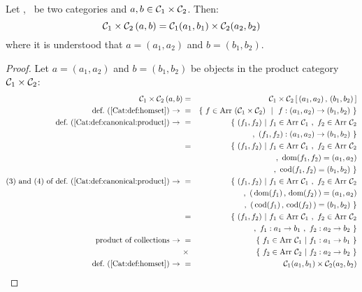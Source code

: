 \begin{prop}\label{Cat:prop:homset:product}
    Let \Cone, \Ctwo\ be two categories and $a,b\in\mbox{${\cal C}_{1}$}\times\mbox{${\cal C}_{2}$}$. Then:
        \[
            \mbox{${\cal C}_{1}$}\times\mbox{${\cal C}_{2}$}\,(a,b) 
            = 
            \mbox{${\cal C}_{1}$}(a_{1},b_{1})\times\mbox{${\cal C}_{2}$}(a_{2},b_{2})
        \]
    where it is understood that $a=(a_{1},a_{2})$ and $b=(b_{1},b_{2})$.
\end{prop}
\begin{proof}
    Let $a=(a_{1},a_{2})$ and $b=(b_{1},b_{2})$ be objects in the
    product category $\mbox{${\cal C}_{1}$}\times\mbox{${\cal C}_{2}$}$:
    \begin{eqnarray*}\Cone\times\Ctwo\,(a,b) 
        &=&\Cone\times\Ctwo\,[\,(a_{1},a_{2})\,,\,(b_{1},b_{2})\,]\\
        \mbox{def.~(\ref{Cat:def:homset})\ $\to$\ }
        &=&\{\ f\in\arr\ (\Cone\times\Ctwo)\ \ |\ \ 
               f : (a_{1},a_{2})\to(b_{1},b_{2})\ \}\\
        \mbox{def.~(\ref{Cat:def:canonical:product})\ $\to$\ }
        &=&\{\ (f_{1},f_{2})\ |\ f_{1}\in\arr\ \Cone\ ,\ f_{2}\in\arr\ \Ctwo\\
        &\ &\,,\ (f_{1},f_{2}) : (a_{1},a_{2})\to(b_{1},b_{2})\ \}\\
        &=&\{\ (f_{1},f_{2})\ |\ f_{1}\in\arr\ \Cone\ ,\ f_{2}\in\arr\ \Ctwo\\
        &\ &\,,\ \dom(f_{1},f_{2})=(a_{1},a_{2})\\
        &\ &\,,\ \cod(f_{1},f_{2})=(b_{1},b_{2})\ \}\\
        \mbox{$(3)$ and $(4)$ of def.~(\ref{Cat:def:canonical:product})\ $\to$\ }
        &=&\{\ (f_{1},f_{2})\ |\ f_{1}\in\arr\ \Cone\ ,\ f_{2}\in\arr\ \Ctwo\\
        &\ &\,,\ (\,\dom(f_{1})\,,\,\dom(f_{2})\,)=(a_{1},a_{2})\\
        &\ &\,,\ (\,\cod(f_{1})\,,\,\cod(f_{2})\,)=(b_{1},b_{2})\ \}\\
        &=&\{\ (f_{1},f_{2})\ |\ f_{1}\in\arr\ \Cone\ ,\ f_{2}\in\arr\ \Ctwo\\
        &\ &\,,\ f_{1}:a_{1}\to b_{1}\ ,\ f_{2}:a_{2}\to b_{2}\ \}\\
        \mbox{product of collections\ $\to$\ }
        &=&\{\ f_{1}\in\arr\ \Cone\ |\ f_{1}:a_{1}\to b_{1}\ \}\\
        &\times& \{\ f_{2}\in\arr\ \Ctwo\ |\ f_{2}:a_{2}\to b_{2}\ \}\\
        \mbox{def.~(\ref{Cat:def:homset})\ $\to$\ }
        &=&\Cone(a_{1},b_{1})\times\Ctwo(a_{2},b_{2})
    \end{eqnarray*}
\end{proof}

